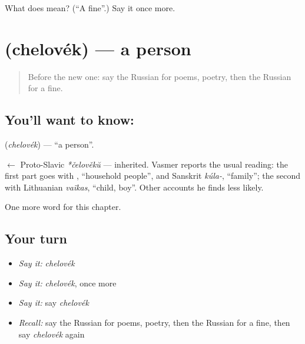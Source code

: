 \begin{tcolorbox}[breakable,colback=teal!4,colframe=teal!35!black,title={Before you move on}]
What does  mean? (\textquotedblleft{}A fine\textquotedblright{}.) Say it once more.
\end{tcolorbox}
\section[\texorpdfstring{\ru{человек} (chelovék)}{человек (chelovék)}]{ (chelovék) — a person}

\label{lesson:RU-C227-chelovek}



\begin{quote}
Before the new one: say the Russian for poems, poetry, then the Russian for a fine.
\end{quote}

\subsection*{You'll want to know: }
\textbf{} (\emph{chelovék}) — \textquotedblleft{}a person\textquotedblright{}.

\begin{cousinweb}
\textbf{} $\leftarrow$ Proto-Slavic \emph{*čelověkŭ} — inherited. Vasmer reports the usual reading: the first part goes with \emph{}, \textquotedblleft{}household people\textquotedblright{}, and Sanskrit \emph{kúla-}, \textquotedblleft{}family\textquotedblright{}; the second with Lithuanian \emph{vaĩkas}, \textquotedblleft{}child, boy\textquotedblright{}. Other accounts he finds less likely.
\end{cousinweb}

\begin{grammarlens}[title={What you've built}]
One more word for this chapter.
\end{grammarlens}

\subsection*{Your turn}
\begin{itemize}
\raggedright
  \item \emph{Say it:} \emph{chelovék}
  \item \emph{Say it:} \emph{chelovék}, once more
  \item \emph{Say it:} say \emph{chelovék}
  \item \emph{Recall:} say the Russian for poems, poetry, then the Russian for a fine, then say \emph{chelovék} again
\end{itemize}

